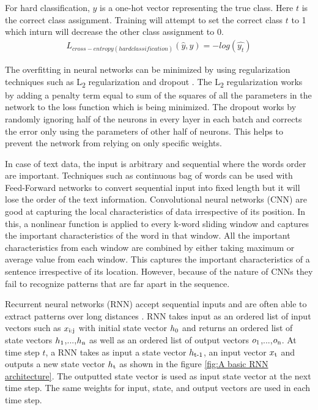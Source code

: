 \documentclass[a4paper, 11pt]{article}
\begin{document}
For hard classification, $y$ is a one-hot vector representing the true class. Here $t$ is the correct class assignment. Training will attempt to set the correct class $t$ to 1 which inturn will decrease the other class assignment to 0.
\begin{align*}
L_{cross-entropy(hard classification)}(\hat{y},y) = -log(\hat{y_t})
\end{align*}

The overfitting in neural networks can be minimized by using regularization techniques such as L\textsubscript{2} regularization and dropout \cite{Hinton2012}. The L\textsubscript{2} regularization works by adding a penalty term equal to sum of the squares of all the parameters in the network to the loss function which is being minimized. The dropout works by randomly ignoring half of the neurons in every layer in each batch and corrects the error only using the parameters of other half of neurons. This helps to prevent the network from relying on only specific weights. 

In case of text data, the input is arbitrary and sequential where the words order are important. Techniques such as continuous bag of words \cite{DBLP:journals/corr/abs-1301-3781} can be used with Feed-Forward networks to convert sequential input into fixed length but it will lose the order of the text information. Convolutional neural networks (CNN) \cite{Bengio1997} are good at capturing the local characteristics of data irrespective of its position. In this, a nonlinear function is applied to every k-word sliding window and captures the important characteristics of the word in that window. All the important characteristics from each window are combined by either taking maximum or average value from each window. This captures the important characteristics of a sentence irrespective of its location. However, because of the nature of CNNs they fail to recognize patterns that are far apart in the sequence.

Recurrent neural networks (RNN) accept sequential inputs and are often able to extract patterns over long distances \cite{Elman}. RNN takes input as an ordered list of input vectors such as $x\textsubscript{i:j}$ with initial state vector $h\textsubscript{0}$ and returns an ordered list of state vectors $h\textsubscript{1}$,...,$h\textsubscript{n}$ as well as an ordered list of output vectors $o\textsubscript{1}$,...,$o\textsubscript{n}$. At time step $t$, a RNN takes as input a state vector $h\textsubscript{t-1}$, an input vector $x\textsubscript{t}$ and outputs a new state vector $h\textsubscript{t}$ as shown in the figure \ref{fig:A basic RNN architecture}. The outputted state vector is used as input state vector at the next time step. The same weights for input, state, and output vectors are used in each time step.  
\end{document}
